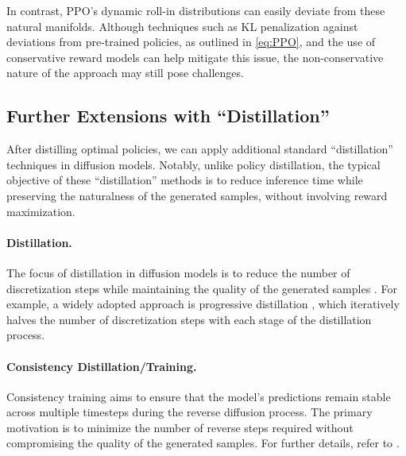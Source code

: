 In contrast, PPO’s dynamic roll-in distributions can easily deviate from these natural manifolds. Although techniques such as KL penalization against deviations from pre-trained policies, as outlined in \eqref{eq:PPO}, and the use of conservative reward models \citep{uehara2024bridging} can help mitigate this issue, the non-conservative nature of the approach may still pose challenges.





\subsection{Further Extensions with ``Distillation''}

After distilling optimal policies, we can apply additional standard ``distillation'' techniques in diffusion models. Notably, unlike policy distillation, the typical objective of these ``distillation'' methods is to reduce inference time while preserving the naturalness of the generated samples, without involving reward maximization.

\paragraph{Distillation.}

The focus of distillation in diffusion models is to reduce the number of discretization steps while maintaining the quality of the generated samples \citep{salimans2022progressive, sun2023accelerating, meng2023distillation}. For example, a widely adopted approach is progressive distillation \citep{salimans2022progressive}, which iteratively halves the number of discretization steps with each stage of the distillation process.

\paragraph{Consistency Distillation/Training.}

Consistency training aims to ensure that the model's predictions remain stable across multiple timesteps during the reverse diffusion process. The primary motivation is to minimize the number of reverse steps required without compromising the quality of the generated samples. For further details, refer to \citet{song2023consistency, li2024towards, ding2023consistency}. 

